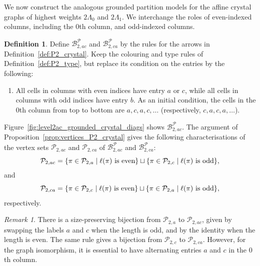 \documentclass[11pt]{article}
\theoremstyle{definition}
\newtheorem{definition}[theorem]{Definition}
\theoremstyle{remark}
\newtheorem{remark}[theorem]{Remark}
\theoremstyle{definition}
\numberwithin{equation}{section}
\begin{document}
We now construct the analogous grounded partition models for the affine crystal graphs of highest weights \( 2\Lambda_0 \) and \( 2\Lambda_1 \). We interchange the roles of even-indexed columns, including the \( 0 \)th column, and odd-indexed columns.

\begin{definition}\label{def:P2_crystal2}
Define \(\mathcal{B}_{2,ac}^{\mathcal{P}}\) and \(\mathcal{B}_{2,ca}^{\mathcal{P}}\) by the rules for the arrows in Definition~\ref{def:P2_crystal}. Keep the colouring and type rules of Definition~\ref{def:P2_type}, but replace its condition on the entries by the following:
\begin{enumerate}
\item[(i\( ' \))] All cells in columns with even indices have entry
  \( a \) or \( c \), while all cells in columns with odd indices have
  entry \( b \). As an initial condition, the cells in the \(0\)th
  column from top to bottom are \(a,c,a,c,\ldots\) (respectively,
  \(c,a,c,a,\ldots\)).
\end{enumerate}

\end{definition}

Figure~\ref{fig:level2ac_grounded_crystal_diags} shows \(\mathcal{B}_{2,ac}^{\mathcal{P}}\). The argument of Proposition~\ref{prop:vertices_P2_crystal} gives the following characterisations of the vertex sets \(\mathcal{P}_{2,ac}\) and \(\mathcal{P}_{2,ca}\) of \(\mathcal{B}_{2,ac}^{\mathcal{P}}\) and \(\mathcal{B}_{2,ca}^{\mathcal{P}}\):
\[
  \mathcal{P}_{2,ac} = \{ \pi \in \mathcal{P}_{2,a} \mid \text{\( \ell(\pi) \) is even}\} \sqcup \{ \pi \in \mathcal{P}_{2,c} \mid \text{\( \ell(\pi) \) is odd}\}, 
\]
and
\[
  \mathcal{P}_{2,ca} = \{ \pi \in \mathcal{P}_{2,c} \mid \text{\( \ell(\pi) \) is even}\} \sqcup \{ \pi \in \mathcal{P}_{2,a} \mid \text{\( \ell(\pi) \) is odd}\},
\]
respectively.

\begin{remark}
There is a size-preserving bijection from $\mathcal{P}_{2,a}$ to $\mathcal{P}_{2,ac}$, given by swapping the labels $a$ and $c$ when the length is odd, and by the identity when the length is even. The same rule gives a bijection from $\mathcal{P}_{2,c}$ to $\mathcal{P}_{2,ca}$. However, for the graph isomorphism, it is essential to have alternating entries $a$ and $c$ in the $0$th column.
\end{remark}
\end{document}
